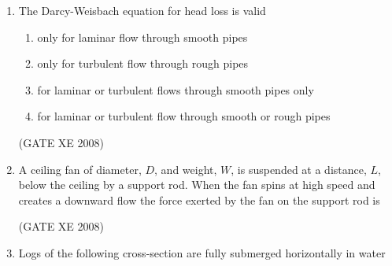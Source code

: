 \documentclass[12pt]{article}
\begin{document}
\begin{enumerate}
\begin{enumerate}
\item  They must be dynamically similar but may or may not be geometrically similar

\item  They must be neither geometrically similar nor dynamically similar

\item  They must be both geometrically similar and dynamically similar
\end{enumerate}

(GATE XE 2008)
\item  The Darcy-Weisbach equation for head loss is valid

\begin{enumerate}
\item  only for laminar flow through smooth pipes

\item  only for turbulent flow through rough pipes

\item  for laminar or turbulent flows through smooth pipes only

\item  for laminar or turbulent flow through smooth or rough pipes
\end{enumerate}

(GATE XE 2008)
\item A ceiling fan of diameter, $D$, and weight, $W$, is suspended at a distance, $L$, below the ceiling by a support rod. When the fan spins at high speed and creates a downward flow the force exerted by the fan on the support rod is

\begin{enumerate}
\end{enumerate}

(GATE XE 2008)
\item Logs of the following cross-section are fully submerged horizontally in water



\end{enumerate}
\end{document}
